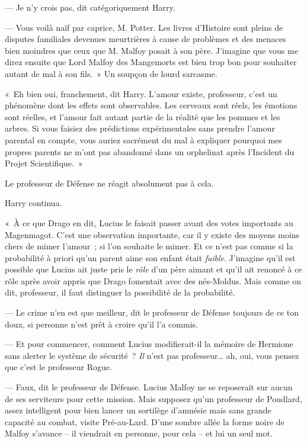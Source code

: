 --- Je n'y crois pas, dit catégoriquement Harry.

--- Vous voilà naïf par caprice, M. Potter.
Les livres d'Histoire sont pleins de disputes familiales devenues meurtrières à cause de problèmes et des menaces bien moindres que ceux que M. Malfoy posait à son père.
J'imagine que vous me direz ensuite que Lord Malfoy des Mangemorts est bien trop bon pour souhaiter autant de mal à son fils.~»
Un soupçon de lourd sarcasme.

«~Eh bien oui, franchement, dit Harry.
L'amour existe, professeur, c'est un phénomène dont les effets sont observables.
Les cerveaux sont réels, les émotions sont réelles, et l'amour fait autant partie de la réalité que les pommes et les arbres.
Si vous faisiez des prédictions expérimentales sans prendre l'amour parental en compte, vous auriez sacrément du mal à expliquer pourquoi mes propres parents ne m'ont pas abandonné dans un orphelinat après l'Incident du Projet Scientifique.~»

Le professeur de Défense ne réagit absolument pas à cela.

Harry continua.

«~À ce que Drago en dit, Lucius le faisait passer avant des votes importants au Magenmagot.
C'est une observation importante, car il y existe des moyens moins chers de mimer l'amour~; si l'on souhaite le mimer.
Et ce n'est pas comme si la probabilité à priori qu'un parent aime son enfant était \emph{faible}.
J'imagine qu'il est possible que Lucius ait juste pris le \emph{rôle} d'un père aimant et qu'il ait renoncé à ce rôle après avoir appris que Drago fomentait avec des nés-Moldus.
Mais comme on dit, professeur, il faut distinguer la possibilité de la probabilité.

--- Le crime n'en est que meilleur, dit le professeur de Défense toujours de ce ton doux, si personne n'est prêt à croire qu'il l'a commis.

--- Et pour commencer, comment Lucius modifierait-il la mémoire de Hermione sans alerter le système de sécurité~?
\emph{Il} n'est pas professeur… ah, oui, vous pensez que c'est le professeur Rogue.

--- Faux, dit le professeur de Défense.
Lucius Malfoy ne se reposerait sur aucun de ses serviteurs pour cette mission.
Mais supposez qu'un professeur de Poudlard, assez intelligent pour bien lancer un sortilège d'amnésie mais sans grande capacité au combat, visite Pré-au-Lard.
D'une sombre allée la forme noire de Malfoy s'avance -- il viendrait en personne, pour cela -- et lui un seul mot.

